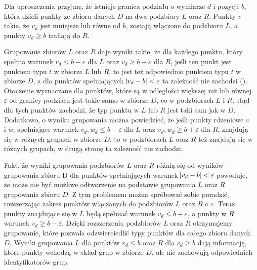 Dla uproszczenia przyjmę, że istnieje granica podziału o wymiarze $ d $ i pozycji $ b $, która dzieli punkty ze zbioru danych $ D $ na dwa podzbiory $ L $ oraz $ R $. Punkty $ v $ takie, że $ v_d $ jest mniejsze lub równe od $ b $, zostają włączone do podzbioru $ L $, a punkty $ v_d \ge b $ trafiają do $ R $.



Grupowanie zbiorów $ L $ oraz $ R $ daje wyniki takie, że dla każdego punktu, który spełnia warunek $ v_d \le b - \varepsilon $ dla $ L $ oraz $ v_d \ge b + \varepsilon $ dla $ R $, jeśli ten punkt jest punktem typu $ t $ w zbiorze $ L $ lub $ R $, to jest też odpowiednio punktem typu $ t $ w zbiorze $ D $, a dla punktów spełniających $ \abs{v_d - b} < \varepsilon  $ ta zależność nie zachodzi (). Otoczenie wyznaczane dla punktów, które są w odległości większej niż lub równej $ \varepsilon $ od granicy podziału jest takie samo w zbiorze $ D $, co w podzbiorach $ L $ i $ R $, stąd dla tych punktów zachodzi, że typ punktu w $ L $ lub $ R $ jest taki sam jak w $ D $. Dodatkowo, o wyniku grupowania można powiedzieć, że jeśli punkty rdzeniowe $ v $ i $ w $, spełniające  warunek $ v_d, w_d \le b - \varepsilon $ dla $ L $ oraz $ v_d, w_d \ge b + \varepsilon $ dla $ R $, znajdują się w różnych grupach w zbiorze $ D $, to w podzbiorach $ L $ oraz $ R $ też znajdują się w różnych grupach, w drugą stronę ta zależność nie zachodzi.\par
Fakt, że wyniki grupowania podzbiorów $ L $ oraz $ R $ różnią się od wyników grupowania zbioru D dla punktów spełniających warunek $ \abs{v_d-b} < \varepsilon $ powoduje, że może nie być możliwe odtworzenie na podstawie grupowania $ L $ oraz $ R $ grupowania zbioru $ D $. Z tym problemem można spróbować sobie poradzić, rozszerzając zakres punktów włączanych do podzbiorów $ L $ oraz $ R $ o $ \varepsilon $. Teraz punkty znajdujące się w $ L $ będą spełniać warunek $ v_d \le b + \varepsilon $, a punkty w $ R $ warunek $ v_d \ge b - \varepsilon $. Dzięki rozszerzeniu podzbiorów $ L $ oraz $ R $ otrzymujemy grupowanie, które pozwala odzwierciedlić typy punktów dla całego zbioru danych $ D $. Wyniki grupowania $ L $ dla punktów $ v_d \le b $ oraz $ R $ dla $ v_d \ge b $ dają informację, które punkty wchodzą w skład grup w zbiorze $ D $, ale nie zachowują odpowiednich identyfikatorów grup.\par

